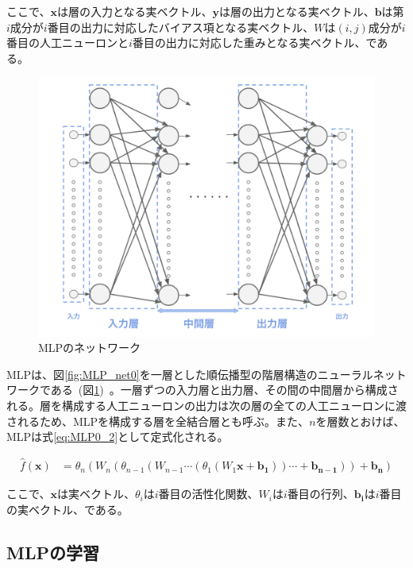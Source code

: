ここで、$\boldsymbol{x}$は層の入力となる実ベクトル、$\boldsymbol{y}$は層の出力となる実ベクトル、$\boldsymbol{b}$は第$i$成分が$i$番目の出力に対応したバイアス項となる実ベクトル、$W$は$(i,j)$成分が$i$番目の人工ニューロンと$i$番目の出力に対応した重みとなる実ベクトル、である。

\begin{figure}[b]
\begin{center}
\includegraphics[width=0.8\hsize]{figure/mlp_net1.png}
\caption{MLPのネットワーク}
\label{fig:MLP_net1}
\end{center}
\end{figure}

MLPは、図\ref{fig:MLP_net0}を一層とした順伝播型の階層構造のニューラルネットワークである~(図\ref{fig:MLP_net1})~。一層ずつの入力層と出力層、その間の中間層から構成される。層を構成する人工ニューロンの出力は次の層の全ての人工ニューロンに渡されるため、MLPを構成する層を全結合層とも呼ぶ。また、$n$を層数とおけば、MLPは式\ref{eq:MLP0_2}として定式化される。

\begin{align}
    \label{eq:MLP0_2}
    \hat{f}(\boldsymbol{x})&=\theta_{n}(W_{n}(\theta_{n-1}(W_{n-1}\cdots(\theta_{1}(W_{1}\boldsymbol{x}+\boldsymbol{b_{1}}))\cdots+\boldsymbol{b_{n-1}}))+\boldsymbol{b_{n}})
\end{align}

ここで、$\boldsymbol{x}$は実ベクトル、$\theta_{i}$は$i$番目の活性化関数、$W_{i}$は$i$番目の行列、$\boldsymbol{b_{i}}$は$i$番目の実ベクトル、である。

\subsection{MLPの学習}

